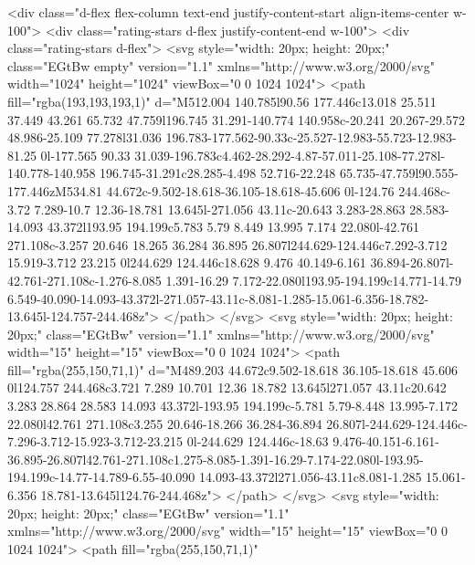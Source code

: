               <div class="d-flex flex-column text-end justify-content-start align-items-center w-100">
                <div class="rating-stars d-flex justify-content-end w-100">
                  <div class="rating-stars d-flex">
                    <svg style="width: 20px; height: 20px;" class="EGtBw empty" version="1.1"
                      xmlns="http://www.w3.org/2000/svg" width="1024" height="1024" viewBox="0 0 1024 1024">
                      <path fill="rgba(193,193,193,1)"
                        d="M512.004 140.785l90.56 177.446c13.018 25.511 37.449 43.261 65.732 47.759l196.745 31.291-140.774 140.958c-20.241 20.267-29.572 48.986-25.109 77.278l31.036 196.783-177.562-90.33c-25.527-12.983-55.723-12.983-81.25 0l-177.565 90.33 31.039-196.783c4.462-28.292-4.87-57.011-25.108-77.278l-140.778-140.958 196.745-31.291c28.285-4.498 52.716-22.248 65.735-47.759l90.555-177.446zM534.81 44.672c-9.502-18.618-36.105-18.618-45.606 0l-124.76 244.468c-3.72 7.289-10.7 12.36-18.781 13.645l-271.056 43.11c-20.643 3.283-28.863 28.583-14.093 43.372l193.95 194.199c5.783 5.79 8.449 13.995 7.174 22.080l-42.761 271.108c-3.257 20.646 18.265 36.284 36.895 26.807l244.629-124.446c7.292-3.712 15.919-3.712 23.215 0l244.629 124.446c18.628 9.476 40.149-6.161 36.894-26.807l-42.761-271.108c-1.276-8.085 1.391-16.29 7.172-22.080l193.95-194.199c14.771-14.79 6.549-40.090-14.093-43.372l-271.057-43.11c-8.081-1.285-15.061-6.356-18.782-13.645l-124.757-244.468z">
                      </path>
                    </svg>
                    <svg style="width: 20px; height: 20px;" class="EGtBw" version="1.1"
                      xmlns="http://www.w3.org/2000/svg" width="15" height="15" viewBox="0 0 1024 1024">
                      <path fill="rgba(255,150,71,1)"
                        d="M489.203 44.672c9.502-18.618 36.105-18.618 45.606 0l124.757 244.468c3.721 7.289 10.701 12.36 18.782 13.645l271.057 43.11c20.642 3.283 28.864 28.583 14.093 43.372l-193.95 194.199c-5.781 5.79-8.448 13.995-7.172 22.080l42.761 271.108c3.255 20.646-18.266 36.284-36.894 26.807l-244.629-124.446c-7.296-3.712-15.923-3.712-23.215 0l-244.629 124.446c-18.63 9.476-40.151-6.161-36.895-26.807l42.761-271.108c1.275-8.085-1.391-16.29-7.174-22.080l-193.95-194.199c-14.77-14.789-6.55-40.090 14.093-43.372l271.056-43.11c8.081-1.285 15.061-6.356 18.781-13.645l124.76-244.468z">
                      </path>
                    </svg>
                    <svg style="width: 20px; height: 20px;" class="EGtBw" version="1.1"
                      xmlns="http://www.w3.org/2000/svg" width="15" height="15" viewBox="0 0 1024 1024">
                      <path fill="rgba(255,150,71,1)"
